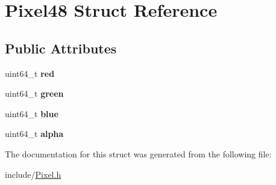 \hypertarget{structPixel48}{}\section{Pixel48 Struct Reference}
\label{structPixel48}
\subsection*{Public Attributes}
\begin{DoxyCompactItemize}
\item 
\mbox{\label{structPixel48_a9edf7721ff59b2807c250cb75306eec2}} 
uint64\+\_\+t {\bfseries red}
\item 
\mbox{\label{structPixel48_a9aaf2682b701096d02be9662a534b24d}} 
uint64\+\_\+t {\bfseries green}
\item 
\mbox{\label{structPixel48_a183380bead790e0f10a1b0b2cad18aeb}} 
uint64\+\_\+t {\bfseries blue}
\item 
\mbox{\label{structPixel48_a7c9e85f293ccaf845965c861d1f0a75d}} 
uint64\+\_\+t {\bfseries alpha}
\end{DoxyCompactItemize}


The documentation for this struct was generated from the following file\+:\begin{DoxyCompactItemize}
\item 
include/\hyperlink{Pixel_8h}{Pixel.\+h}\end{DoxyCompactItemize}
